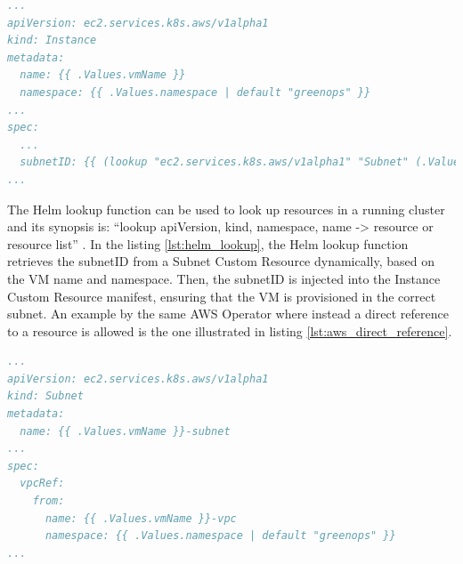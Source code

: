 \begin{lstlisting}[language=yaml, caption={Helm Lookup example: dynamically resolving SubnetIDs}, label={lst:helm_lookup}, float=htpb]
...
apiVersion: ec2.services.k8s.aws/v1alpha1
kind: Instance
metadata:
  name: {{ .Values.vmName }}
  namespace: {{ .Values.namespace | default "greenops" }}
...
spec:
  ...
  subnetID: {{ (lookup "ec2.services.k8s.aws/v1alpha1" "Subnet" (.Values.namespace | default "greenops") (printf "%s-subnet" .Values.vmName)).status.subnetID }}
...
\end{lstlisting}

The Helm lookup function can be used to look up resources in a running cluster and its synopsis is: ``lookup apiVersion, kind, namespace, name -> resource or resource list'' \cite{helm_lookup}.
In the listing \ref{lst:helm_lookup}, the Helm lookup function retrieves the subnetID from a Subnet Custom Resource dynamically, based on the VM name and namespace. Then, the subnetID is injected into the Instance Custom Resource manifest, ensuring that the VM is provisioned in the correct subnet.
An example by the same AWS Operator where instead a direct reference to a resource is allowed is the one illustrated in listing \ref{lst:aws_direct_reference}. \\

\begin{lstlisting}[language=yaml, caption={AWS Operator direct reference example}, label={lst:aws_direct_reference}]
...
apiVersion: ec2.services.k8s.aws/v1alpha1
kind: Subnet
metadata:
  name: {{ .Values.vmName }}-subnet
...
spec:
  vpcRef: 
    from: 
      name: {{ .Values.vmName }}-vpc
      namespace: {{ .Values.namespace | default "greenops" }}
...
\end{lstlisting}

